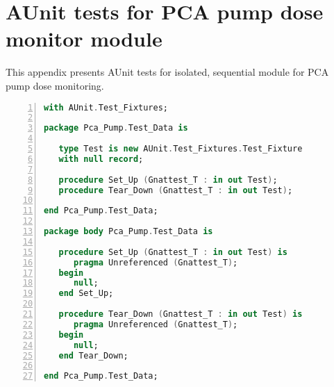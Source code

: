
\cleardoublepage

\chapter{AUnit tests for PCA pump dose monitor module}
\label{Appendix:pcapump:dose_monitor_module:aunit}

This appendix presents AUnit tests for isolated, sequential module for PCA pump dose monitoring.

\singlespacing
\begin{lstlisting}[language=ada, gobble=0, numbers=left, caption={Package \lstinline{Pca_Pump.Test_Data}}, label={listing:pcapump:dose_monitor_module:test_data}]
with AUnit.Test_Fixtures;

package Pca_Pump.Test_Data is

   type Test is new AUnit.Test_Fixtures.Test_Fixture
   with null record;

   procedure Set_Up (Gnattest_T : in out Test);
   procedure Tear_Down (Gnattest_T : in out Test);

end Pca_Pump.Test_Data;

package body Pca_Pump.Test_Data is

   procedure Set_Up (Gnattest_T : in out Test) is
      pragma Unreferenced (Gnattest_T);
   begin
      null;
   end Set_Up;

   procedure Tear_Down (Gnattest_T : in out Test) is
      pragma Unreferenced (Gnattest_T);
   begin
      null;
   end Tear_Down;

end Pca_Pump.Test_Data;
\end{lstlisting} 
\doublespacing

